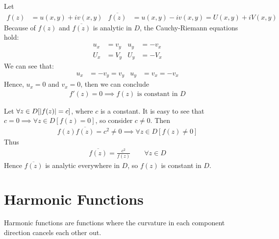 \documentclass[12pt, english]{book}
\begin{document}
	\begin{example}
		Let 
		\begin{align*}
			f(z) &= u(x,y) + iv(x,y) & \overline{f(z)} &= u(x,y) - iv(x,y) = U(x,y) + iV(x,y)
		\end{align*}
		Because of \(f(z)\) and \(\overline{f(z)}\) is analytic in \(D\), the Cauchy-Riemann equations hold:
		\begin{align*}
			u_x &= v_y		&	u_y &= -v_x \\
			U_x &= V_y		&	U_y &= -V_x
		\end{align*}
		We can see that:
		\begin{align*}
			u_x &= -v_y	= v_y &	u_y &= v_x = -v_x
		\end{align*}
		Hence, \(u_x = 0\) and \(v_x = 0\), then we can conclude
		\begin{align*}
			f'(z) = 0 \implies f(z) \text{ is constant in } D
		\end{align*}
	\end{example}

	\begin{example}
		Let \(\forall z \in D[\abs{f(z)} = c]\), where \(c\) is a constant. It is easy to see that \(c = 0 \implies \forall z \in D[f(z) = 0]\), so consider \(c \neq 0\). Then
		\begin{align*}
			f(z)\overline{f(z)} = c^2 \neq 0 \implies \forall z \in D[f(z) \neq 0]
		\end{align*}
		Thus
		\begin{align*}
			\overline{f(z)} = \frac{c^2}{f(z)} \qquad \forall z \in D
		\end{align*}
		Hence \(\overline{f(z)}\) is analytic everywhere in \(D\), so \(f(z)\) is constant in \(D\).
		\label{Abs of analytic function is constant in domain implies that function is constant Example - Complex}
	\end{example}
	
	\section{Harmonic Functions} \label{Harmonic Functions Section - Complex}
	
	Harmonic functions are functions where the curvature in each component direction cancels each other out.
	
\end{document}
